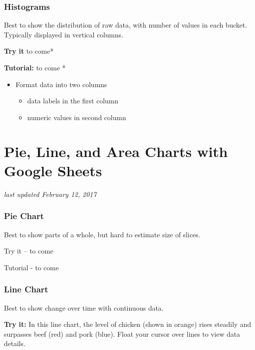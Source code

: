 \documentclass[
  english,
]{book}
\providecommand{\tightlist}{%
  \setlength{\itemsep}{0pt}\setlength{\parskip}{0pt}}
\begin{document}
\hypertarget{histograms}{%
\subsubsection*{Histograms}\label{histograms}}

Best to show the distribution of raw data, with number of values in each bucket. Typically displayed in vertical columns.

\textbf{Try it} to come*

\textbf{Tutorial:} to come *

\begin{itemize}
\tightlist
\item
  Format data into two columns

  \begin{itemize}
  \tightlist
  \item
    data labels in the first column
  \item
    numeric values in second column
  \end{itemize}
\end{itemize}

\hypertarget{pie-line-area-google}{%
\section{Pie, Line, and Area Charts with Google Sheets}\label{pie-line-area-google}}

\emph{last updated February 12, 2017}

\hypertarget{pie-chart}{%
\subsubsection*{Pie Chart}\label{pie-chart}}

Best to show parts of a whole, but hard to estimate size of slices.

Try it -- to come

Tutorial - to come

\hypertarget{line-chart}{%
\subsubsection*{Line Chart}\label{line-chart}}

Best to show change over time with continuous data.

\textbf{Try it:} In this line chart, the level of chicken (shown in orange) rises steadily and surpasses beef (red) and pork (blue). Float your cursor over lines to view data details.
\end{document}
